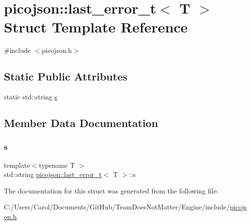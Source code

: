 \hypertarget{structpicojson_1_1last__error__t}{}\section{picojson\+:\+:last\+\_\+error\+\_\+t$<$ T $>$ Struct Template Reference}
\label{structpicojson_1_1last__error__t}


{\ttfamily \#include $<$picojson.\+h$>$}

\subsection*{Static Public Attributes}
\begin{DoxyCompactItemize}
\item 
static std\+::string \hyperlink{structpicojson_1_1last__error__t_a270361f4321424bfd800c36607bf0411}{s}
\end{DoxyCompactItemize}


\subsection{Member Data Documentation}
\hypertarget{structpicojson_1_1last__error__t_a270361f4321424bfd800c36607bf0411}{}\label{structpicojson_1_1last__error__t_a270361f4321424bfd800c36607bf0411} 
\subsubsection{\texorpdfstring{s}{s}}
{\footnotesize\ttfamily template$<$typename T $>$ \\
std\+::string \hyperlink{structpicojson_1_1last__error__t}{picojson\+::last\+\_\+error\+\_\+t}$<$ T $>$\+::s\hspace{0.3cm}{\ttfamily [static]}}



The documentation for this struct was generated from the following file\+:\begin{DoxyCompactItemize}
\item 
C\+:/\+Users/\+Carol/\+Documents/\+Git\+Hub/\+Team\+Does\+Not\+Matter/\+Engine/include/\hyperlink{picojson_8h}{picojson.\+h}\end{DoxyCompactItemize}
